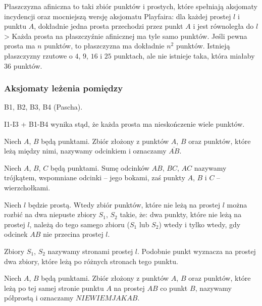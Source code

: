 \begin{proposition}
    Płaszczyzna afiniczna to taki zbiór punktów i prostych, które spełniają aksjomaty incydencji oraz mocniejszą wersję aksjomatu Playfaira: dla każdej prostej $l$ i punktu $A$, dokładnie jedna prosta przechodzi przez punkt $A$ i jest równoległa do $l$>
    Każda prosta na płaszczyźnie afinicznej ma tyle samo punktów.
    Jeśli pewna prosta ma $n$ punktów, to płaszczyzna ma dokładnie $n^2$ punktów.
    Istnieją płaszczyzny rzutowe o $4$, $9$, $16$ i $25$ punktach, ale nie istnieje taka, która miałaby $36$ punktów.
\end{proposition} %

\subsubsection{Aksjomaty leżenia pomiędzy}
B1, B2, B3, B4 (Pascha).

I1-I3 + B1-B4 wynika stąd, że każda prosta ma nieskończenie wiele punktów.

\begin{definition}[odcinek]
    Niech $A$, $B$ będą punktami.
    Zbiór złożony z punktów $A$, $B$ oraz punktów, które leżą między nimi, nazywamy odcinkiem i oznaczamy $\overline {AB}$.
\end{definition} %

\begin{definition}[trójkąt]
    Niech $A$, $B$, $C$ będą punktami.
    Sumę odcinków $AB$, $BC$, $AC$ nazywamy trójkątem, wspomniane odcinki -- jego bokami, zaś punkty $A$, $B$ i $C$ -- wierzchołkami.
\end{definition} %

\begin{proposition}
    Niech $l$ będzie prostą.
    Wtedy zbiór punktów, które nie leżą na prostej $l$ można rozbić na dwa niepuste zbiory $S_1$, $S_2$ takie, że: dwa punkty, które nie leżą na prostej $l$, należą do tego samego zbioru ($S_1$ lub $S_2$) wtedy i tylko wtedy, gdy odcinek $AB$ nie przecina prostej $l$.
\end{proposition} %

Zbiory $S_1$, $S_2$ nazywamy stronami prostej $l$.
Podobnie punkt wyznacza na prostej dwa zbiory, które leżą po różnych stronach tego punktu.

\begin{definition}[półprosta]
    Niech $A$, $B$ będą punktami.
    Zbiór złożony z punktów $A$, $B$ oraz punktów, które leżą po tej samej stronie punktu $A$ na prostej $AB$ co punkt $B$, nazywamy półprostą i oznaczamy $NIE WIEM JAK AB$.
\end{definition} %

